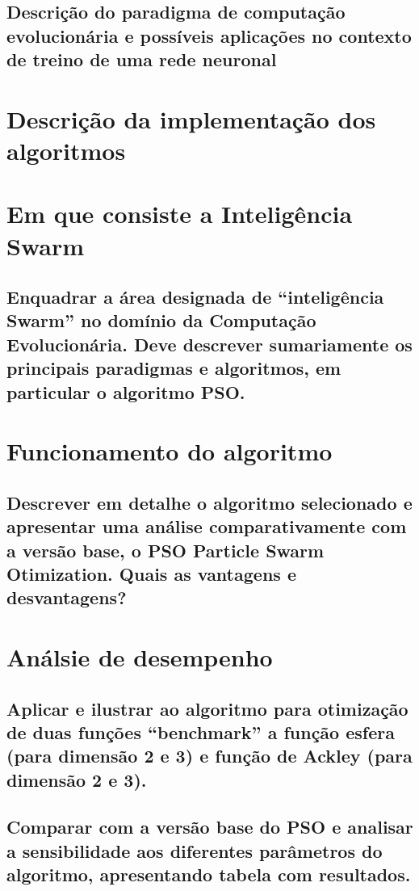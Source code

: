 \documentclass[10pt]{article}
\begin{document}
\subsection{Descrição do paradigma de computação evolucionária e possíveis aplicações no contexto de treino de uma rede neuronal}\label{sec:apre-da-org}

\section{Descrição da implementação dos algoritmos}\label{sec:Des-da-imp-dos-alg}

\section{Em que consiste a Inteligência Swarm}\label{sec:ev-da-org}
\subsection{Enquadrar a área designada de “inteligência Swarm” no domínio da Computação
            Evolucionária. Deve descrever sumariamente os principais paradigmas e algoritmos,
            em particular o algoritmo PSO.}\label{sec:apre-da-org}

\section{Funcionamento do algoritmo}\label{sec:an-da-info-fin-da-org}
\subsection{Descrever em detalhe o algoritmo selecionado e apresentar uma análise comparativamente com a versão base, o PSO \– 
            Particle Swarm Otimization. Quais as vantagens e desvantagens?}\label{sec:apre-da-org}

\section{Análsie de desempenho}\label{sec:an-da-info-fin-da-org}
\subsection{Aplicar e ilustrar ao algoritmo para otimização de duas funções “benchmark” \– a função esfera (para dimensão 2 e 3) e 
            função de Ackley (para dimensão 2 e 3). }\label{sec:apre-da-org}
\subsection{Comparar com a versão base do PSO e analisar a sensibilidade aos diferentes parâmetros do algoritmo, apresentando tabela 
            com resultados.}\label{sec:apre-da-org}
\end{document}
